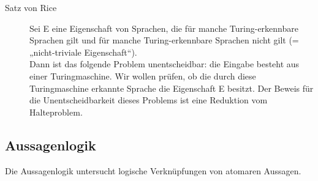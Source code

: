 \begin{description}
    \item[Satz von Rice]
        Sei E eine Eigenschaft von Sprachen, die für manche Turing-erkennbare Sprachen gilt und für manche Turing-erkennbare Sprachen nicht gilt (= „nicht-triviale Eigenschaft“). \\ Dann ist das folgende Problem unentscheidbar: die Eingabe besteht aus einer Turingmaschine. Wir wollen prüfen, ob die durch diese Turingmaschine erkannte Sprache die Eigenschaft E besitzt. Der Beweis für die Unentscheidbarkeit dieses Problems ist eine Reduktion vom Halteproblem. 

\end{description}

\newpage
\subsection{Aussagenlogik}
    Die Aussagenlogik untersucht logische Verknüpfungen von atomaren Aussagen. 

